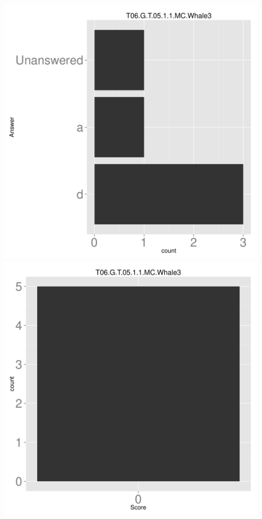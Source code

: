 \documentclass[12pt,english,nohyper]{tufte-handout}\usepackage[]{graphicx}\usepackage[]{color}
\begin{document}
\begin{center} \includegraphics[width=.45\linewidth]{Topic06_AB_83_answer} \includegraphics[width=.45\linewidth]{Topic06_AB_83_score} \end{center} 
\end{document}
